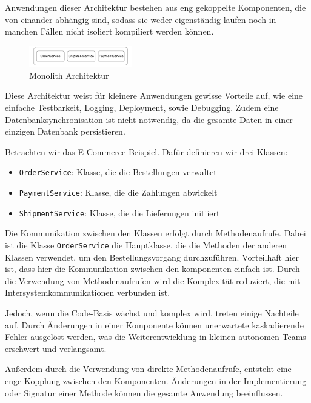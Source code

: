 \documentclass[acmtog]{acmart}
\begin{document}
Anwendungen dieser Architektur bestehen aus eng gekoppelte Komponenten, die von
einander abhängig sind, sodass sie weder eigenständig laufen noch in manchen Fällen
nicht isoliert kompiliert werden können. \cite[485]{mono3}


\begin{figure}[h!]
    \centering
    \includegraphics[width=0.4\textwidth]{images/mono/mono.pdf}
    \caption{Monolith Architektur}
    \label{fig:mono}
\end{figure}

Diese Architektur weist für kleinere Anwendungen gewisse Vorteile auf,
wie eine einfache Testbarkeit, Logging, Deployment, sowie Debugging.
Zudem eine Datenbanksynchronisation ist nicht notwendig, da die
gesamte Daten in einer einzigen Datenbank persistieren. \cite[2]{mono4}

Betrachten wir das E-Commerce-Beispiel.
Dafür definieren wir drei Klassen:
\begin{itemize}
    \item \texttt{OrderService}: Klasse, die die Bestellungen verwaltet
    \item \texttt{PaymentService}: Klasse, die die Zahlungen abwickelt
    \item \texttt{ShipmentService}: Klasse, die die Lieferungen initiiert
\end{itemize}

Die Kommunikation zwischen den Klassen erfolgt durch Methodenaufrufe.
Dabei ist die Klasse \texttt{OrderService} die Hauptklasse, die die
Methoden der anderen Klassen verwendet, um den Bestellungsvorgang durchzuführen.
Vorteilhaft hier ist, dass hier die Kommunikation zwischen den komponenten einfach ist.
Durch die Verwendung von Methodenaufrufen wird die Komplexität reduziert, die mit
Intersystemkommunikationen verbunden ist.

Jedoch, wenn die Code-Basis wächst und komplex wird, treten einige Nachteile auf.
Durch Änderungen in einer Komponente können unerwartete kaskadierende Fehler
ausgelöst werden, was die Weiterentwicklung in kleinen autonomen
Teams erschwert und verlangsamt.

Außerdem durch die Verwendung von direkte Methodenaufrufe, entsteht eine enge Kopplung
zwischen den Komponenten.
Änderungen in der Implementierung oder Signatur einer Methode können die gesamte
 Anwendung beeinflussen.
\end{document}
